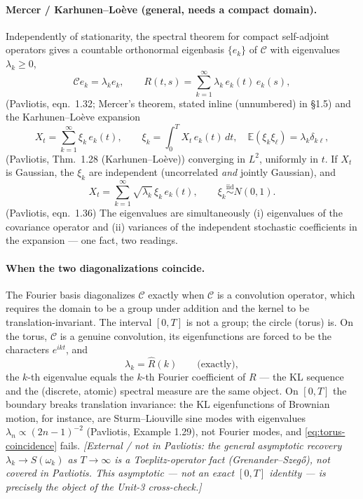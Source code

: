 \documentclass[11pt]{article}
\newcommand{\extnote}[1]{{\small\color{extgray}\emph{[External / not in Pavliotis: #1]}}}
\newcommand{\pav}[1]{{\small\color{hubblue}(Pavliotis, #1)}}
\begin{document}
\paragraph{Mercer / Karhunen--Lo\`eve (general, needs a compact domain).}
Independently of stationarity, the spectral theorem for compact self-adjoint operators gives a countable orthonormal eigenbasis $\{e_k\}$ of $\mathcal{C}$ with eigenvalues $\lambda_k \geq 0$,
\begin{equation}
\mathcal{C}e_k = \lambda_k e_k, \qquad R(t,s) = \sum_{k=1}^{\infty}\lambda_k\,e_k(t)\,e_k(s),
\label{eq:kl-eigen}
\end{equation}
\pav{eqn.~1.32; Mercer's theorem, stated inline (unnumbered) in \S1.5} and the Karhunen--Lo\`eve expansion
\begin{equation}
X_t = \sum_{k=1}^{\infty} \xi_k\, e_k(t), \qquad \xi_k = \int_0^T X_t\, e_k(t)\,dt,\quad \mathbb{E}(\xi_k\xi_\ell) = \lambda_k\delta_{k\ell},
\label{eq:kl}
\end{equation}
\pav{Thm.~1.28 (Karhunen--Lo\`eve)} converging in $L^2$, uniformly in $t$. If $X_t$ is Gaussian, the $\xi_k$ are independent (uncorrelated \emph{and} jointly Gaussian), and
\begin{equation}
X_t = \sum_{k=1}^{\infty} \sqrt{\lambda_k}\,\xi_k\, e_k(t), \qquad \xi_k \overset{\text{iid}}{\sim} N(0,1).
\label{eq:kl-gaussian}
\end{equation}
\pav{eqn.~1.36} The eigenvalues are simultaneously (i) eigenvalues of the covariance operator and (ii) variances of the independent stochastic coefficients in the expansion --- one fact, two readings.

\paragraph{When the two diagonalizations coincide.}
The Fourier basis diagonalizes $\mathcal{C}$ exactly when $\mathcal{C}$ is a convolution operator, which requires the domain to be a group under addition and the kernel to be translation-invariant. The interval $[0,T]$ is not a group; the circle (torus) is. On the torus, $\mathcal{C}$ is a genuine convolution, its eigenfunctions are forced to be the characters $e^{ikt}$, and
\begin{equation}
\lambda_k = \hat R(k) \qquad \text{(exactly)},
\label{eq:torus-coincidence}
\end{equation}
the $k$-th eigenvalue equals the $k$-th Fourier coefficient of $R$ --- the KL sequence and the (discrete, atomic) spectral measure are the same object. On $[0,T]$ the boundary breaks translation invariance: the KL eigenfunctions of Brownian motion, for instance, are Sturm--Liouville sine modes with eigenvalues $\lambda_n \propto (2n-1)^{-2}$ \pav{Example 1.29}, not Fourier modes, and \eqref{eq:torus-coincidence} fails. \extnote{the general asymptotic recovery $\lambda_k \to S(\omega_k)$ as $T\to\infty$ is a Toeplitz-operator fact (Grenander--Szeg\H{o}), not covered in Pavliotis. This asymptotic --- not an exact $[0,T]$ identity --- is precisely the object of the Unit-3 cross-check.}
\end{document}

